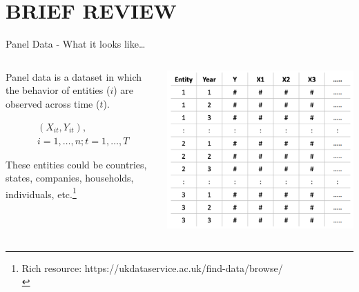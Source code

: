 \documentclass[
  10pt,
  ignorenonframetext,
]{beamer}
\begin{document}
\hypertarget{brief-review}{%
\section{BRIEF REVIEW}\label{brief-review}}

\begin{frame}{Panel Data - What it looks like\ldots{}}
\protect\hypertarget{panel-data---what-it-looks-like}{}
\begin{columns}[T]
\begin{column}{.3\textwidth}
\vspace{7mm}

\small

Panel data is a dataset in which the behavior of entities (\(i\)) are
observed across time (\(t\)).

\vspace{2mm}

\[
\begin{aligned}
&(X_{it},Y_{it}), \\
&i = 1,\ldots,n; t = 1,\ldots, T
\end{aligned}
\]

\vspace{2mm}

These entities could be countries, states, companies, households,
individuals,
etc.\footnote[frame]{Rich resource: https://ukdataservice.ac.uk/find-data/browse/ \\}
\end{column}

\begin{column}{0.48\textwidth}
\begin{flushright}\includegraphics[width=1.2\linewidth]{pictures/PanelData_longform} \end{flushright}
\end{column}
\end{columns}
\end{frame}
\end{document}
